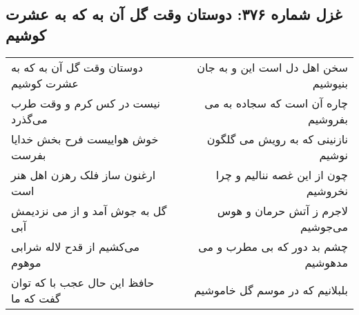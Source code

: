 \begin{center}
\section*{غزل شماره ۳۷۶: دوستان وقت گل آن به که به عشرت کوشیم}
\label{sec:sh376}
\begin{longtable}{l p{0.5cm} r}
دوستان وقت گل آن به که به عشرت کوشیم
&&
سخن اهل دل است این و به جان بنیوشیم
\\
نیست در کس کرم و وقت طرب می‌گذرد
&&
چاره آن است که سجاده به می بفروشیم
\\
خوش هواییست فرح بخش خدایا بفرست
&&
نازنینی که به رویش می گلگون نوشیم
\\
ارغنون ساز فلک رهزن اهل هنر است
&&
چون از این غصه ننالیم و چرا نخروشیم
\\
گل به جوش آمد و از می نزدیمش آبی
&&
لاجرم ز آتش حرمان و هوس می‌جوشیم
\\
می‌کشیم از قدح لاله شرابی موهوم
&&
چشم بد دور که بی مطرب و می مدهوشیم
\\
حافظ این حال عجب با که توان گفت که ما
&&
بلبلانیم که در موسم گل خاموشیم
\\
\end{longtable}
\end{center}
